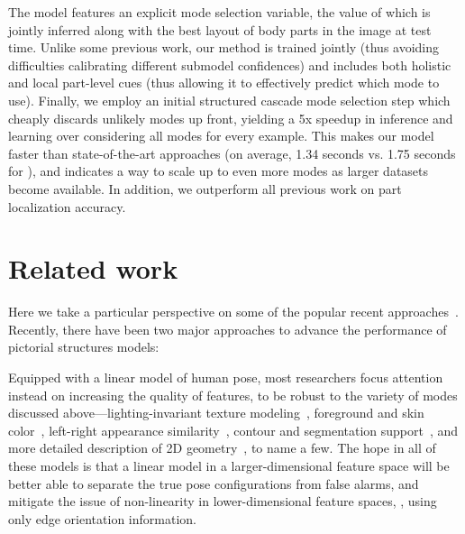 The model features an explicit mode selection variable, the value of which is 
jointly inferred along with the best layout of body parts in the image at test 
time.  Unlike some previous work, our method is trained jointly (thus avoiding 
difficulties calibrating different submodel confidences) and includes both 
holistic and local part-level cues (thus allowing it to effectively predict 
which mode to use).  Finally, we employ an initial structured cascade mode 
selection step which cheaply discards unlikely modes up front, yielding a 5x 
speedup in inference and learning over considering all modes for every example.  
This makes our model faster than state-of-the-art approaches (on average, 1.34 
seconds vs. 1.75 seconds for \citet{ramanan2011}), and indicates a way to scale 
up to even more modes as larger datasets become available.  In addition, we 
outperform all previous work on part localization accuracy.  
 

\section{Related work}\label{sec:llps-rel}
Here we take a particular perspective on some of the popular recent 
approaches~\citet{devacrf,eichner09,sapp2010cascades,sapp2011,andriluka09,ddtran}.  
Recently, there have been two major approaches to advance the performance of 
pictorial structures models:

  Equipped with a linear model of 
human pose, most researchers focus attention instead on increasing the quality 
of features, to be robust to the variety of modes discussed 
above---lighting-invariant texture modeling~\citep{andriluka09}, foreground and 
skin color~\citep{devacrf,eichner09}, left-right appearance 
similarity~\citep{ddtran,sapp2011}, contour and segmentation 
support~\citep{sapp2010cascades,sapp2011}, and more detailed description of 2D 
geometry~\citep{ddtran,sapp2011}, to name a few.  The hope in all of these 
models is that a linear model in a larger-dimensional feature space will be 
better able to separate the true pose configurations from false alarms, and 
mitigate the issue of non-linearity in lower-dimensional feature spaces, \eg, 
using only edge orientation information.

